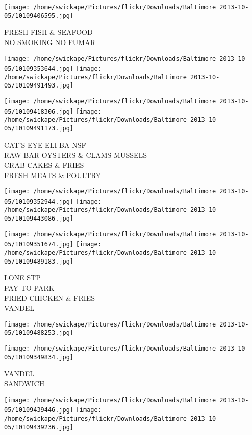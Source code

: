 \documentclass[10pt,letterpaper]{article}
\begin{document}
\vspace{0.25in}
\texttt{[image: /home/swickape/Pictures/flickr/Downloads/Baltimore 2013-10-05/10109406595.jpg]}

FRESH FISH \& SEAFOOD\\
NO SMOKING NO FUMAR\\
\pagebreak

\texttt{[image: /home/swickape/Pictures/flickr/Downloads/Baltimore 2013-10-05/10109353644.jpg]}
\texttt{[image: /home/swickape/Pictures/flickr/Downloads/Baltimore 2013-10-05/10109491493.jpg]}

\texttt{[image: /home/swickape/Pictures/flickr/Downloads/Baltimore 2013-10-05/10109418306.jpg]}
\texttt{[image: /home/swickape/Pictures/flickr/Downloads/Baltimore 2013-10-05/10109491173.jpg]}

CAT'S EYE ELI BA NSF\\
RAW BAR OYSTERS \& CLAMS MUSSELS\\
CRAB CAKES \& FRIES\\
FRESH MEATS \& POULTRY\\
\pagebreak

\texttt{[image: /home/swickape/Pictures/flickr/Downloads/Baltimore 2013-10-05/10109352944.jpg]}
\texttt{[image: /home/swickape/Pictures/flickr/Downloads/Baltimore 2013-10-05/10109443086.jpg]}

\texttt{[image: /home/swickape/Pictures/flickr/Downloads/Baltimore 2013-10-05/10109351674.jpg]}
\texttt{[image: /home/swickape/Pictures/flickr/Downloads/Baltimore 2013-10-05/10109489183.jpg]}

LONE STP\\
PAY TO PARK\\
FRIED CHICKEN \& FRIES\\
VANDEL\\
\pagebreak

\texttt{[image: /home/swickape/Pictures/flickr/Downloads/Baltimore 2013-10-05/10109488253.jpg]}

\vspace{0.25in}
\texttt{[image: /home/swickape/Pictures/flickr/Downloads/Baltimore 2013-10-05/10109349834.jpg]}

VANDEL\\
SANDWICH\\
\pagebreak

\texttt{[image: /home/swickape/Pictures/flickr/Downloads/Baltimore 2013-10-05/10109439446.jpg]}
\texttt{[image: /home/swickape/Pictures/flickr/Downloads/Baltimore 2013-10-05/10109439236.jpg]}
\end{document}

